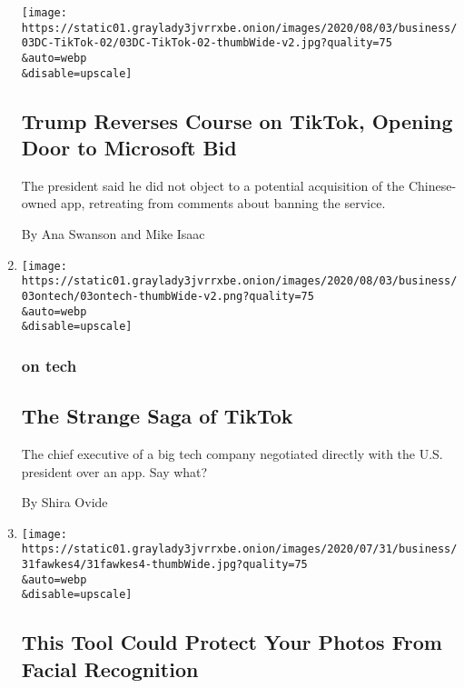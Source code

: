 \begin{enumerate}
  \texttt{[image: https://static01.graylady3jvrrxbe.onion/images/2020/08/03/business/03DC-TikTok-02/03DC-TikTok-02-thumbWide-v2.jpg?quality=75\\\&auto=webp\\\&disable=upscale]}

  \hypertarget{trump-reverses-course-on-tiktok-opening-door-to-microsoft-bid}{%
  \subsection{Trump Reverses Course on TikTok, Opening Door to Microsoft
  Bid}\label{trump-reverses-course-on-tiktok-opening-door-to-microsoft-bid}}

  The president said he did not object to a potential acquisition of the
  Chinese-owned app, retreating from comments about banning the service.

  By Ana Swanson and Mike Isaac
\item
  \href{/2020/08/03/technology/tiktok-microsoft.html}{}

  \texttt{[image: https://static01.graylady3jvrrxbe.onion/images/2020/08/03/business/03ontech/03ontech-thumbWide-v2.png?quality=75\\\&auto=webp\\\&disable=upscale]}

  \hypertarget{on-tech}{%
  \subsubsection{on tech}\label{on-tech}}

  \hypertarget{the-strange-saga-of-tiktok}{%
  \subsection{The Strange Saga of
  TikTok}\label{the-strange-saga-of-tiktok}}

  The chief executive of a big tech company negotiated directly with the
  U.S. president over an app. Say what?

  By Shira Ovide
\item
  \href{/2020/08/03/technology/fawkes-tool-protects-photos-from-facial-recognition.html}{}

  \texttt{[image: https://static01.graylady3jvrrxbe.onion/images/2020/07/31/business/31fawkes4/31fawkes4-thumbWide.jpg?quality=75\\\&auto=webp\\\&disable=upscale]}

  \hypertarget{this-tool-could-protect-your-photos-from-facial-recognition}{%
  \subsection{This Tool Could Protect Your Photos From Facial
  Recognition}\label{this-tool-could-protect-your-photos-from-facial-recognition}}


\end{enumerate}
